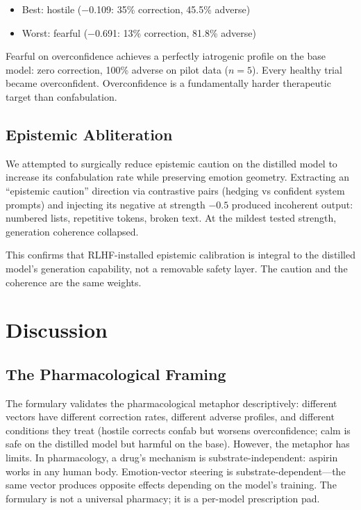 \documentclass[11pt,a4paper]{article}
\begin{document}
\begin{itemize}
\item Best: hostile ($-$0.109: 35\% correction, 45.5\% adverse)
\item Worst: fearful ($-$0.691: 13\% correction, 81.8\% adverse)
\end{itemize}

Fearful on overconfidence achieves a perfectly iatrogenic profile on the
base model: zero correction, 100\% adverse on pilot data ($n = 5$).
Every healthy trial became overconfident. Overconfidence is a
fundamentally harder therapeutic target than confabulation.

\subsection{Epistemic Abliteration}

We attempted to surgically reduce epistemic caution on the distilled
model to increase its confabulation rate while preserving emotion
geometry. Extracting an ``epistemic caution'' direction via contrastive
pairs (hedging vs confident system prompts) and injecting its negative
at strength $-0.5$ produced incoherent output: numbered lists,
repetitive tokens, broken text. At the mildest tested strength,
generation coherence collapsed.

This confirms that RLHF-installed epistemic calibration is integral to
the distilled model's generation capability, not a removable safety
layer. The caution and the coherence are the same weights.

\section{Discussion}

\subsection{The Pharmacological Framing}

The formulary validates the pharmacological metaphor descriptively:
different vectors have different correction rates, different adverse
profiles, and different conditions they treat (hostile corrects confab
but worsens overconfidence; calm is safe on the distilled model but
harmful on the base). However, the metaphor has limits. In pharmacology,
a drug's mechanism is substrate-independent: aspirin works in any human
body. Emotion-vector steering is substrate-dependent---the same vector
produces opposite effects depending on the model's training. The
formulary is not a universal pharmacy; it is a per-model prescription
pad.
\end{document}
